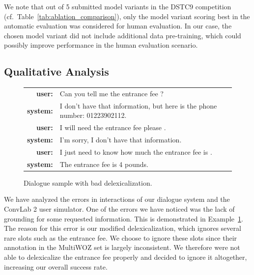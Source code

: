 \documentclass[letterpaper]{article} %
\newcommand{\exampleref}[1]{Example~\ref{#1}}
\newenvironment{example}{\begin{figure}[!ht]}{\end{figure}}
\newcommand{\exampleref}[1]{Figure~\ref{#1}}
\begin{document}
We note that out of 5 submitted model variants in the DSTC9 competition (cf.~Table~\ref{tab:ablation_comparison}), only the model variant scoring best in the automatic evaluation was considered for human evaluation.
In our case, the chosen model variant did not include additional data pre-training, which could possibly improve performance in the human evaluation scenario.


\subsection{Qualitative Analysis}
\begin{example}
\setlength{\tabcolsep}{2pt}
\begin{mdframed}[style=ExampleFrame]
\begin{tabularx}{\textwidth}{rX}
\textbf{user:} & Can you tell me the entrance fee ? \\
\textbf{system:} & I don't have that information, but here is the phone number: 01223902112. \\
\textbf{user:} & I will need the entrance fee please .\\
\textbf{system:} & I'm sorry, I don't have that information.\\
\textbf{user:} & I just need to know how much the entrance fee is . \\
\textbf{system:} & The entrance fee is 4 pounds. \\
\end{tabularx}
\end{mdframed}
\caption{Dialogue sample with bad delexicalization.\label{ex:error1}}
\end{example}

We have analyzed the errors in interactions of our dialogue system and the ConvLab 2 user simulator. One of the errors we have noticed was the lack of grounding for some requested information. This is demonstrated in \exampleref{ex:error1}. The reason for this error is our modified delexicalization, which ignores several rare slots such as the entrance fee. 
We choose to ignore these slots since their annotation in the MultiWOZ set is largely inconsistent.
We therefore were not able to delexicalize the entrance fee properly and decided to ignore it altogether, increasing our overall success rate.
\end{document}
